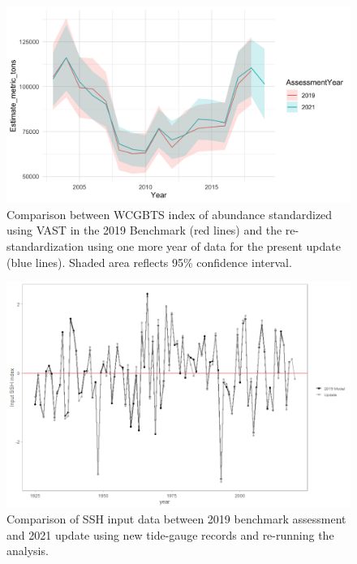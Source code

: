 \documentclass[11pt,
  english,
  a4paper,
]{article}
\begin{document}
\begin{figure}
\centering
\includegraphics[width=1\textwidth,height=1\textheight]{figs/VAST_Comparisons.png}
\caption{Comparison between WCGBTS index of abundance standardized using VAST in the 2019 Benchmark (red lines) and the re-standardization using one more year of data for the present update (blue lines). Shaded area reflects 95\% confidence interval. \label{fig:WCGBTindexcompare}}
\end{figure}

\tagmcend\tagstructend


\begin{figure}
\centering
\includegraphics[width=1\textwidth,height=1\textheight]{figs/ssh_compare.png}
\caption{Comparison of SSH input data between 2019 benchmark assessment and 2021 update using new tide-gauge records and re-running the analysis. \label{fig:ssh-plot}}
\end{figure}
\end{document}
